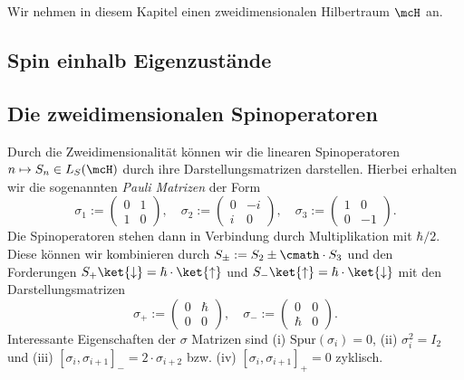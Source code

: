 \documentclass{subfiles}
\begin{document}
    Wir nehmen in diesem Kapitel einen zweidimensionalen Hilbertraum $\mcH$ an. 

    \subsection{Spin einhalb Eigenzustände}


    \subsection{Die zweidimensionalen Spinoperatoren}
        Durch die Zweidimensionalität können wir die linearen Spinoperatoren $n\mapsto S_n\in L_S(\mcH)$ durch ihre Darstellungsmatrizen darstellen. Hierbei erhalten wir die sogenannten \emph{Pauli Matrizen} der Form 
        \[
            \sigma_1 := \begin{pmatrix}
                0 & 1 \\
                1 & 0
            \end{pmatrix}, \quad
            \sigma_2 := \begin{pmatrix}
                0 & -i \\
                i & 0
            \end{pmatrix}, \quad
            \sigma_3 := \begin{pmatrix}
                1 & 0 \\
                0 & -1
            \end{pmatrix}.
        \]
        Die Spinoperatoren stehen dann in Verbindung durch Multiplikation mit $\hbar/2$. Diese können wir kombinieren durch $S_\pm := S_2\pm\cmath\cdot S_3$ und den Forderungen $S_+\ket{\downarrow} = \hbar\cdot\ket{\uparrow}$ und $S_-\ket{\uparrow} = \hbar\cdot\ket{\downarrow}$ mit den Darstellungsmatrizen
        \[
            \sigma_+ := \begin{pmatrix}
                0 & \hbar \\
                0 & 0
            \end{pmatrix}, \quad 
            \sigma_- := \begin{pmatrix}
                0 & 0 \\
                \hbar & 0
            \end{pmatrix}.
        \]
        Interessante Eigenschaften der $\sigma$ Matrizen sind (i) $\text{Spur}(\sigma_i) = 0$, (ii) $\sigma_i^2 = I_2$ und (iii) $[\sigma_i,\sigma_{i+1}]_- = 2\cdot\sigma_{i+2}$ bzw. (iv) $[\sigma_i,\sigma_{i+1}]_+ = 0$ zyklisch. 
\end{document}
